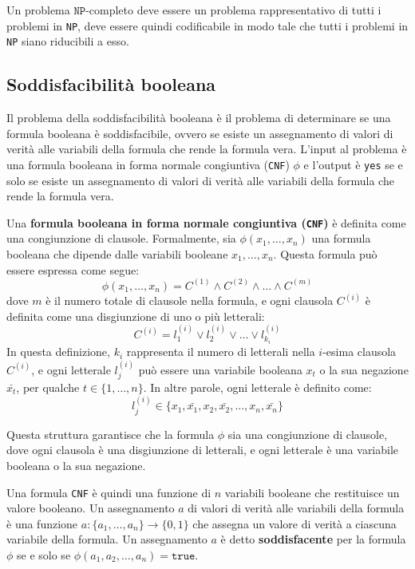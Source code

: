 Un problema $\texttt{NP}$-completo deve essere un problema rappresentativo di tutti
i problemi in \texttt{NP}, deve essere quindi codificabile in modo tale che tutti i problemi
in \texttt{NP} siano riducibili a esso.

\subsection{Soddisfacibilità booleana}
Il problema della soddisfacibilità booleana è il problema di determinare se una formula booleana
è soddisfacibile, ovvero se esiste un assegnamento di valori di verità alle variabili della formula
che rende la formula vera. L'input al problema è una formula booleana in forma normale congiuntiva
(\texttt{CNF}) $\phi$ e l'output è \texttt{yes} se e solo se esiste un assegnamento di valori di verità
alle variabili della formula che rende la formula vera.

Una \textbf{formula booleana in forma normale congiuntiva (\texttt{CNF})} è definita come una
congiunzione di clausole. Formalmente, sia $\phi(x_1, \dots, x_n)$ una formula booleana
che dipende dalle variabili booleane $x_1, \dots, x_n$. Questa formula può essere espressa
come segue:
\[
\phi(x_1, \dots, x_n) = C^{(1)} \land C^{(2)} \land \dots \land C^{(m)}
\]
dove $m$ è il numero totale di clausole nella formula, e ogni clausola $C^{(i)}$ è definita
come una disgiunzione di uno o più letterali:
\[
C^{(i)} = l_1^{(i)} \lor l_2^{(i)} \lor \dots \lor l_{k_i}^{(i)}
\]
In questa definizione, $k_i$ rappresenta il numero di letterali nella $i$-esima clausola
$C^{(i)}$, e ogni letterale $l_j^{(i)}$ può essere una variabile booleana $x_t$ o la sua
negazione $\bar{x_t}$, per qualche $t \in \{1, \dots, n\}$. In altre parole, ogni letterale
è definito come:
\[
l_j^{(i)} \in \{x_1, \bar{x_1}, x_2, \bar{x_2}, \dots, x_n, \bar{x_n}\}
\]

Questa struttura garantisce che la formula $\phi$ sia una congiunzione di clausole, dove
ogni clausola è una disgiunzione di letterali, e ogni letterale è una variabile booleana
o la sua negazione.

Una formula \texttt{CNF} è quindi una funzione di $n$ variabili booleane che
restituisce un valore booleano. Un assegnamento $a$ di valori di verità alle
variabili della formula è una funzione $a: \{a_1, \dots, a_n\} \to \{0, 1\}$
che assegna un valore di verità a ciascuna variabile della formula. Un
assegnamento $a$ è detto \textbf{soddisfacente} per la formula $\phi$
se e solo se $\phi(a_1, a_2, \dots, a_n) = \texttt{true}$.
